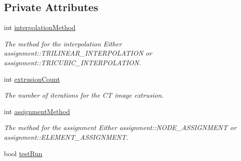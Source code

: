 \subsection*{Private Attributes}
\begin{DoxyCompactItemize}
\item 
\hypertarget{classcommand_1_1_parameter_parser_a234649998e2c18fbb8d47bde6c1f1ba7}{
int \hyperlink{classcommand_1_1_parameter_parser_a234649998e2c18fbb8d47bde6c1f1ba7}{interpolationMethod}}
\label{classcommand_1_1_parameter_parser_a234649998e2c18fbb8d47bde6c1f1ba7}

\begin{DoxyCompactList}\small\item\em The method for the interpolation Either assignment::TRILINEAR\_\-INTERPOLATION or assignment::TRICUBIC\_\-INTERPOLATION. \item\end{DoxyCompactList}\item 
\hypertarget{classcommand_1_1_parameter_parser_a1bcc6f566e71ca9a8cfba54d81dbc625}{
int \hyperlink{classcommand_1_1_parameter_parser_a1bcc6f566e71ca9a8cfba54d81dbc625}{extrusionCount}}
\label{classcommand_1_1_parameter_parser_a1bcc6f566e71ca9a8cfba54d81dbc625}

\begin{DoxyCompactList}\small\item\em The number of iterations for the CT image extrusion. \item\end{DoxyCompactList}\item 
\hypertarget{classcommand_1_1_parameter_parser_a62f598530edbad20d02e0ea5d3918f39}{
int \hyperlink{classcommand_1_1_parameter_parser_a62f598530edbad20d02e0ea5d3918f39}{assignmentMethod}}
\label{classcommand_1_1_parameter_parser_a62f598530edbad20d02e0ea5d3918f39}

\begin{DoxyCompactList}\small\item\em The method for the assignment Either assignment::NODE\_\-ASSIGNMENT or assignment::ELEMENT\_\-ASSIGNMENT. \item\end{DoxyCompactList}\item 
\hypertarget{classcommand_1_1_parameter_parser_ac67cdcc0339a96d20fb6c05fcc167ebf}{
bool \hyperlink{classcommand_1_1_parameter_parser_ac67cdcc0339a96d20fb6c05fcc167ebf}{testRun}}
\label{classcommand_1_1_parameter_parser_ac67cdcc0339a96d20fb6c05fcc167ebf}


\end{DoxyCompactItemize}
